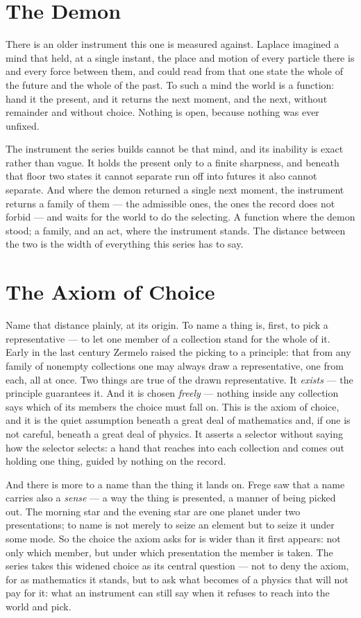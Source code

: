 \section*{The Demon}

There is an older instrument this one is measured against. Laplace imagined a mind that held, at a single
instant, the place and motion of every particle there is and every force between them, and could read from that
one state the whole of the future and the whole of the past. To such a mind the world is a function: hand it the
present, and it returns the next moment, and the next, without remainder and without choice. Nothing is open,
because nothing was ever unfixed.

The instrument the series builds cannot be that mind, and its inability is exact rather than vague. It holds the
present only to a finite sharpness, and beneath that floor two states it cannot separate run off into futures it
also cannot separate. And where the demon returned a single next moment, the instrument returns a family of them
--- the admissible ones, the ones the record does not forbid --- and waits for the world to do the selecting. A
function where the demon stood; a family, and an act, where the instrument stands. The distance between the two
is the width of everything this series has to say.

\section*{The Axiom of Choice}

Name that distance plainly, at its origin. To name a thing is, first, to pick a representative --- to let one
member of a collection stand for the whole of it. Early in the last century Zermelo raised the picking to a
principle: that from any family of nonempty collections one may always draw a representative, one from each, all
at once. Two things are true of the drawn representative. It \emph{exists} --- the principle guarantees it. And
it is chosen \emph{freely} --- nothing inside any collection says which of its members the choice must fall on.
This is the axiom of choice, and it is the quiet assumption beneath a great deal of mathematics and, if one is
not careful, beneath a great deal of physics. It asserts a selector without saying how the selector selects: a
hand that reaches into each collection and comes out holding one thing, guided by nothing on the record.

And there is more to a name than the thing it lands on. Frege saw that a name carries also a \emph{sense} --- a
way the thing is presented, a manner of being picked out. The morning star and the evening star are one planet
under two presentations; to name is not merely to seize an element but to seize it under some mode. So the choice
the axiom asks for is wider than it first appears: not only which member, but under which presentation the member
is taken. The series takes this widened choice as its central question --- not to deny the axiom, for as
mathematics it stands, but to ask what becomes of a physics that will not pay for it: what an instrument can
still say when it refuses to reach into the world and pick.

